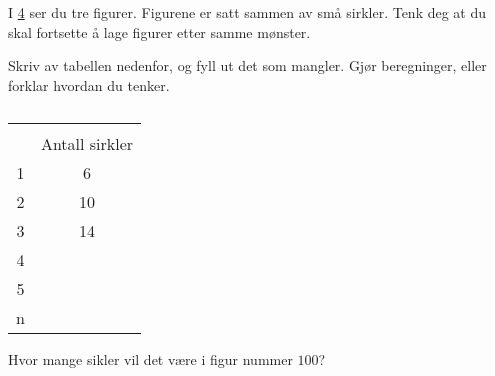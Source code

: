\begin{figure}[H]
    \centering
    \begin{subfigure}[b]{0.32\textwidth}
        \centering
        \caption{}
        \label{fig:del-1-oppgave-8-a}
    \end{subfigure}\hfill%
    \begin{subfigure}[b]{0.32\textwidth}
        \centering
        \caption{}
        \label{fig:del-1-oppgave-8-b}
    \end{subfigure}\hfill%
    \begin{subfigure}[b]{0.32\textwidth}
        \centering
        \vspace{-0.45cm}
        \caption{}
        \label{fig:del-1-oppgave-8-c}
    \end{subfigure}
    \caption{}\label{fig:del-1-oppgave-8}
\end{figure}

I \cref{fig:del-1-oppgave-8} ser du tre figurer. Figurene er satt sammen av små
sirkler. Tenk deg at du skal fortsette å lage figurer etter samme mønster.

\begin{oppgaver}
     Skriv av tabellen nedenfor, og fyll ut det som mangler. Gjør
    beregninger, eller forklar hvordan du tenker.
\end{oppgaver}

\begin{table}[H]
    \centering
    \begin{tabular}{|c | c|} \hline
         \Rowcolor & \\ \Rowcolor
         \multirow{-2}{*}{Figur} & \multirow{-2}{*}{Antall sirkler}  \\ \hline
         1 & \phantom{1}6 \\
         2 & 10 \\
         3 & 14 \\
         4 &    \\
         5 &    \\
         n &    \\ \hline
    \end{tabular}
    \caption{}
    \label{tab:del-1-oppgave-1.8}
\end{table}

\begin{oppgaver}
     Hvor mange sikler vil det være i figur nummer $100$?
\end{oppgaver}


